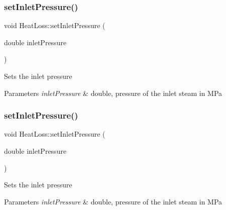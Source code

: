 \mbox{\label{class_heat_loss_ab0a6b1f2a964d161d25758318f25f7e3}} 
\subsubsection{\texorpdfstring{set\+Inlet\+Pressure()}{setInletPressure()}\hspace{0.1cm}{\footnotesize\ttfamily [2/3]}}
{\footnotesize\ttfamily void Heat\+Loss\+::set\+Inlet\+Pressure (\begin{DoxyParamCaption}\item[{double}]{inlet\+Pressure }\end{DoxyParamCaption})}

Sets the inlet pressure 
\begin{DoxyParams}{Parameters}
{\em inlet\+Pressure} & double, pressure of the inlet steam in M\+Pa \\
\hline
\end{DoxyParams}
\mbox{\label{class_heat_loss_ab0a6b1f2a964d161d25758318f25f7e3}} 
\subsubsection{\texorpdfstring{set\+Inlet\+Pressure()}{setInletPressure()}\hspace{0.1cm}{\footnotesize\ttfamily [3/3]}}
{\footnotesize\ttfamily void Heat\+Loss\+::set\+Inlet\+Pressure (\begin{DoxyParamCaption}\item[{double}]{inlet\+Pressure }\end{DoxyParamCaption})}

Sets the inlet pressure 
\begin{DoxyParams}{Parameters}
{\em inlet\+Pressure} & double, pressure of the inlet steam in M\+Pa \\
\hline
\end{DoxyParams}
\mbox{\label{class_heat_loss_a2a4a80b16c1f975e194ae466b20d46bd}} 
